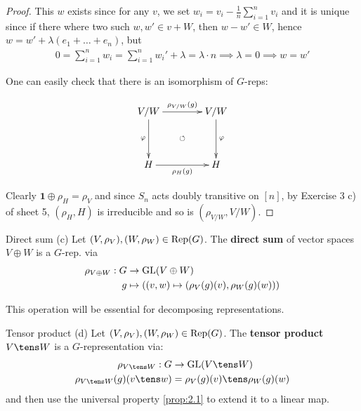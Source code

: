 \documentclass[twoside = false,	%
		headsepline,		%
		parskip = true,
		]{scrbook}						%
\begin{document}
\begin{proof}
        This $w$ exists since for any $v$, we set $w_i = v_i - \frac{1}{n}\sum_{i=1}^n v_i$ and it is unique since if there where two such $w,w' \in v +W$, then $w-w' \in W$, hence $w = w' + \lambda (e_1 + \dots + e_n)$, but
        \begin{equation*}
        \begin{split}
            0 = \sum_{i=1}^n w_i = \sum_{i=1}^n w_i' + \lambda = \lambda \cdot n \implies \lambda = 0 \implies w = w'
        \end{split}
        \end{equation*}
        
        One can easily check that there is an isomorphism of $G$-reps:
        
        \begin{equation*}
        \xymatrix@C=40pt @R=40pt {
            V/W \ar^{\rho_{V/W}(g)}[r] \ar[d]_{\varphi} & V/W\ar[d]^{\varphi} \\
            H \ar[r]_{\rho_H(g)} & H\ar@{}|{\circlearrowleft}[ul]
        }
        \end{equation*}
        
        Clearly $\mathbf{1} \oplus \rho_H = \rho_V$ and since $S_n$ acts doubly transitive on $[n]$, by Exercise 3 c) of sheet 5, $(\rho_H,H)$ is irreducible and so is $(\rho_{V/W},V/W)$.
    \end{proof}
     
    \begin{definition*}
    {Direct sum (c)}
        Let $(V,\rho_V), (W,\rho_W) \in \mathrm{Rep}(G)$. The \textbf{direct sum} of vector spaces $V \oplus W$ is a $G$-rep. via
        \begin{equation*}
        \begin{split}
            \rho_{V \oplus W}: G &\to \mathrm{GL}(V \oplus W) \\
                            g &\mapsto \left( (v,w) \mapsto (\rho_V(g)(v),\rho_W(g)(w))\right)
        \end{split}
        \end{equation*}
    \end{definition*}
    This operation will be essential for decomposing representations.
    
    \begin{definition*}
    {Tensor product (d)}
        Let $(V,\rho_V), (W,\rho_W) \in \mathrm{Rep}(G)$. The \textbf{tensor product} $V \tens W$ is a $G$-representation via:
        \begin{equation*}
        \begin{split}
            \rho_{V \tens W}: G &\to \GL(V \tens W) \\
                    \rho_{V \tens W}(g)(v \tens w) &= \rho_V(g)(v) \tens \rho_W(g)(w)
        \end{split}
        \end{equation*}
        and then use the universal property \ref{prop:2.1} to extend it to a linear map.
    \end{definition*}
\end{document}
